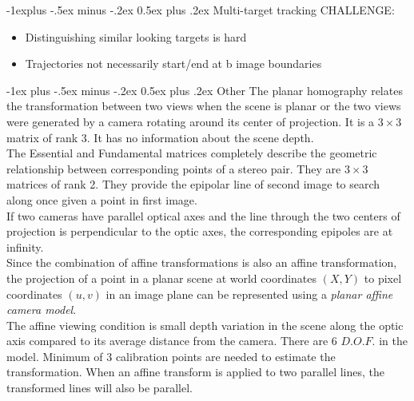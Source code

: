 \documentclass[10pt,landscape]{article}
\makeatletter
\renewcommand{\section}{\@startsection{section}{1}{0mm}%
                                {-1ex plus -.5ex minus -.2ex}%
                                {0.5ex plus .2ex}%
                                {\normalfont\large\bfseries}}
\renewcommand{\subsection}{\@startsection{subsection}{2}{0mm}%
                                {-1explus -.5ex minus -.2ex}%
                                {0.5ex plus .2ex}%
                                {\normalfont\normalsize\bfseries}}
\makeatother
\begin{document}
\begin{multicols}{3}
\subsection{Multi-target tracking}
CHALLENGE:
\begin{itemize}
    \item Distinguishing similar looking targets is hard
    \item Trajectories not necessarily start/end at b image boundaries
\end{itemize}



\section{Other}
The planar homography relates the transformation between two views when the scene is planar or the two views were generated by a camera rotating around its center of projection. It is a $3\times3$ matrix of rank 3. It has no information about the scene depth.\\

The Essential and Fundamental matrices completely describe the geometric relationship between corresponding points of a stereo pair. They are $3\times3$ matrices of rank 2. They provide the epipolar line of second image to search along once given a point in first image.\\

If two cameras have parallel optical axes and the line through the two centers of projection is perpendicular to the optic axes, the corresponding epipoles are at infinity.\\

Since the combination of affine transformations is also an affine transformation, the projection of a point in a planar scene at world coordinates $(X, Y)$ to pixel coordinates
$(u, v)$ in an image plane can be represented using a \textit{planar affine camera model}.\\

The affine viewing condition is small depth variation in the scene along the optic axis compared to its average distance from the camera. There are 6 $D.O.F.$ in the model. Minimum of 3 calibration points are needed to estimate the transformation. When an affine transform is applied to two parallel lines, the transformed lines will also be parallel.\\


\end{multicols}
\end{document}

